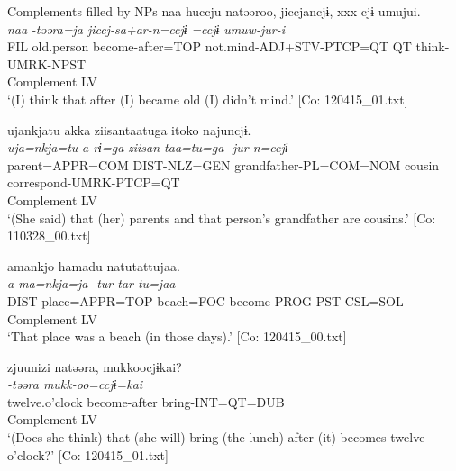 \ea   Complements filled by NPs \label{ex:9.36}
\ea %
 \gllll  naa  huccju  natəəroo,  jiccjancjɨ,                                       xxx  cjɨ  umujui.  \\
      \textit{naa}  \textit{}  \textit{-təəra=ja  jiccj-sa+ar-n=ccjɨ}             \textit{=ccjɨ}  \textit{umuw-jur-i}  \\
      FIL  old.person  become-after=TOP  not.mind-ADJ+STV-PTCP=QT                            QT  think-UMRK-NPST  \\
        Complement  LV  \\
      \glt       ‘(I) think that after (I) became old (I) didn’t mind.’ [Co: 120415\_01.txt]

\ex \label{ex:9.36b} %
    \gllll  ujankjatu  akka  ziisantaatuga    {\textbar}itoko{\textbar}  najuncjɨ.\\
      \textit{uja=nkja=tu}  \textit{a-rɨ=ga}  \textit{ziisan-taa=tu=ga}   \textit{}  \textit{-jur-n=ccjɨ}\\
      parent=APPR=COM  DIST-NLZ=GEN  grandfather-PL=COM=NOM  cousin  correspond-UMRK-PTCP=QT\\
                                                             Complement  LV\\
      \glt       ‘(She said) that (her) parents and that person’s grandfather are cousins.’ [Co: 110328\_00.txt]

\ex \label{ex:9.36c} %
    \gllll  amankjo  hamadu  natutattujaa.\\
      \textit{a-ma=nkja=ja}  \textit{}  \textit{-tur-tar-tu=jaa}\\
      DIST-place=APPR=TOP  beach=FOC  become-PROG-PST-CSL=SOL\\
        Complement  LV\\
      \glt       ‘That place was a beach (in those days).’ [Co: 120415\_00.txt]

\ex \label{ex:9.36d} %
    \gllll  {\textbar}zjuunizi{\textbar}  natəəra,  mukkoocjɨkai?\\
      \textit{}  \textit{-təəra  mukk-oo=ccjɨ=kai}\\
      twelve.o’clock  become-after  bring-INT=QT=DUB\\
      Complement  LV  \\
      \glt       ‘(Does she think) that (she will) bring (the lunch) after (it) becomes twelve o’clock?’ [Co: 120415\_01.txt]
    \z
\z

